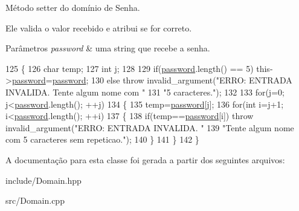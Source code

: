 Método setter do domínio de Senha. 

Ele valida o valor recebido e atribui se for correto. 
\begin{DoxyParams}{Parâmetros}
{\em password} & uma string que recebe a senha. \\
\hline
\end{DoxyParams}

\begin{DoxyCode}
125 \{
126     \textcolor{keywordtype}{char} temp;
127     \textcolor{keywordtype}{int} j;
128 
129     \textcolor{keywordflow}{if}(\hyperlink{classPassword_ac9fc114f63a9435c29530413b303564e}{password}.length() == 5) this->\hyperlink{classPassword_ac9fc114f63a9435c29530413b303564e}{password}=\hyperlink{classPassword_ac9fc114f63a9435c29530413b303564e}{password};
130     \textcolor{keywordflow}{else} \textcolor{keywordflow}{throw} invalid\_argument(\textcolor{stringliteral}{"ERRO: ENTRADA INVALIDA. Tente algum nome com "}
131         \textcolor{stringliteral}{"5 caracteres."});
132 
133     \textcolor{keywordflow}{for}(j=0; j<\hyperlink{classPassword_ac9fc114f63a9435c29530413b303564e}{password}.length(); ++j)
134     \{
135         temp=\hyperlink{classPassword_ac9fc114f63a9435c29530413b303564e}{password}[j];
136         \textcolor{keywordflow}{for}(\textcolor{keywordtype}{int} i=j+1; i<\hyperlink{classPassword_ac9fc114f63a9435c29530413b303564e}{password}.length(); ++i)
137         \{
138             \textcolor{keywordflow}{if}(temp==\hyperlink{classPassword_ac9fc114f63a9435c29530413b303564e}{password}[i]) \textcolor{keywordflow}{throw} invalid\_argument(\textcolor{stringliteral}{"ERRO: ENTRADA INVALIDA. "}
139             \textcolor{stringliteral}{"Tente algum nome com 5 caracteres sem repeticao."});
140         \}
141     \}
142 \}
\end{DoxyCode}


A documentação para esta classe foi gerada a partir dos seguintes arquivos\+:\begin{DoxyCompactItemize}
\item 
include/Domain.\+hpp\item 
src/Domain.\+cpp\end{DoxyCompactItemize}
